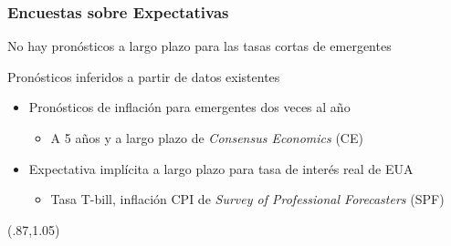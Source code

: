 \documentclass[12pt, aspectratio=169, xcolor=dvipsnames]{beamer}
\begin{document}



\begin{frame}[label=SCBP]
\frametitle{Encuestas sobre Expectativas}

No hay pronósticos a largo plazo para las tasas cortas de emergentes

Pronósticos inferidos a partir de datos existentes



\begin{itemize}
\item \alert{Pronósticos de inflación} para emergentes dos veces al año
\begin{itemize}
	\item A 5 años y a largo plazo de \textit{Consensus Economics} (CE) 
\end{itemize}

\item Expectativa implícita a largo plazo para \alert{tasa de interés real de EUA} 
\begin{itemize}
\item Tasa T-bill, inflación CPI de \textit{Survey of Professional Forecasters} (SPF)
\end{itemize}
\end{itemize}

\begin{textblock*}{3cm}(.87\textwidth,1.05\textheight)
	\hyperlink{YldCBP}{}
\end{textblock*}
\end{frame}
\end{document}
